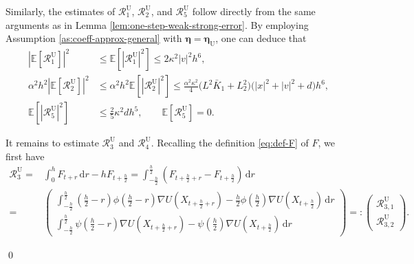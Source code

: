 \documentclass[12pt]{article}
\newenvironment{redtext}
  {\color{black}\ignorespaces}
  {\ignorespacesafterend}
\numberwithin{equation}{section}
\renewenvironment{proof}%
  {\begin{trivlist}%
   \item[]\ignorespaces}%
  {\qed\end{trivlist}}
\newcommand{\E}{\mathbb{E}}
\newcommand{\dd}{\mathrm{d}}
\begin{document}
\begin{redtext}
\begin{proof}
Similarly, the estimates of \(\mathcal R^{\mathrm{U}}_1\), \(\mathcal R^{\mathrm{U}}_2\), and
\(\mathcal R^{\mathrm{U}}_5\) follow directly from the same arguments as in Lemma \ref{lem:one-step-weak-strong-error}. By employing Assumption \ref{as:coeff-approx-general} with $\boldsymbol{\eta} = \boldsymbol{\eta}_\mathrm{U}$, one can deduce that 
\begin{align}
|\E[\mathcal R^{\mathrm{U}}_1]|^2
&\leq
\E[|\mathcal R^{\mathrm{U}}_1|^2]
\leq
2\kappa^2|v|^2h^6,
\\
\alpha^2h^2|\E[\mathcal R^{\mathrm{U}}_2]|^2
&\leq
\alpha^2h^2\E[|\mathcal R^{\mathrm{U}}_2|^2]
\leq
\tfrac{\alpha^2\kappa^2}{4}
\bigl(
L^2\bar K_1+L_2^2
\bigr)
\bigl(
|x|^2+|v|^2+d
\bigr)h^6,
\\
\E[|\mathcal R^{\mathrm{U}}_5|^2]
&\leq
\tfrac{2}{5}\kappa^2 dh^5,
\qquad
\E[\mathcal R^{\mathrm{U}}_5]=0.
\label{eq:R125-UBU-estimates}
\end{align}

It remains to estimate \(\mathcal R^{\mathrm{U}}_3\) and \(\mathcal R^{\mathrm{U}}_4\).
Recalling the definition \eqref{eq:def-F} of \(F\), we first have
\begin{align}
\mathcal R^{\mathrm{U}}_3
=  &
\int_0^hF_{t+r}\,\dd r
-
hF_{t+\frac h2}
=
\int_{-\frac h2}^{\frac h2}
\left(
F_{t+\frac h2+r}
-
F_{t+\frac h2}
\right)
\,\dd r
\\   
=   &
\left(
\begin{aligned}
\int_{-\frac h2}^{\frac h2}
(\tfrac{h}{2}-r)
\phi(\tfrac{h}{2}-r)
\nabla U(X_{t+\frac{h}{2}+r})
-
\tfrac{h}{2}\phi(\tfrac{h}{2})
\nabla U(X_{t+\frac{h}{2}})
\,\dd r
\\
\int_{-\frac h2}^{\frac h2}
\psi(\tfrac{h}{2}-r)\nabla U(X_{t+\frac{h}{2}+r})
-
\psi(\tfrac{h}{2})
\nabla U(X_{t+\frac{h}{2}})
\,\dd r
\end{aligned}
\right)
=:
\left(
\begin{aligned}
\mathcal{R}^{\mathrm{U}}_{3,1}\\
\mathcal{R}^{\mathrm{U}}_{3,2}   
\end{aligned}
\right).
\label{eq:R3-midpoint-representation}
\end{align}


\end{proof}
\end{redtext}
\end{document}
